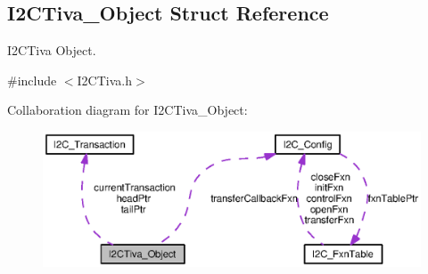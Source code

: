 \subsection{I2\-C\-Tiva\-\_\-\-Object Struct Reference}
\label{struct_i2_c_tiva___object}


I2\-C\-Tiva Object.  




{\ttfamily \#include $<$I2\-C\-Tiva.\-h$>$}



Collaboration diagram for I2\-C\-Tiva\-\_\-\-Object\-:
\nopagebreak
\begin{figure}[H]
\begin{center}
\leavevmode
\includegraphics[width=350pt]{struct_i2_c_tiva___object__coll__graph}
\end{center}
\end{figure}

